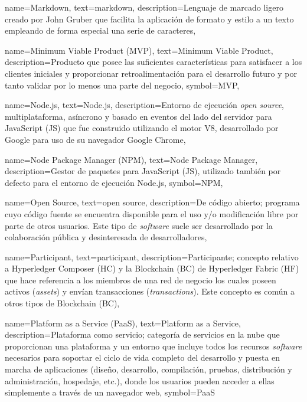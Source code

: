 {
    name={Markdown},
    text={markdown},
    description={Lenguaje de marcado ligero creado por John Gruber que facilita la aplicación de formato y estilo a un texto empleando de forma especial una serie de caracteres},
}

{
    name={Minimum Viable Product (MVP)},
    text={Minimum Viable Product},
    description={Producto que posee las suficientes características para satisfacer a los clientes iniciales y proporcionar retroalimentación para el desarrollo futuro y por tanto validar por lo menos una parte del negocio},
    symbol={MVP},
}

{
    name={Node.js},
    text={Node.js},
    description={Entorno de ejecución \textit{open source}, multiplataforma, asíncrono y basado en eventos del lado del servidor para JavaScript (JS) que fue construido utilizando el motor V8, desarrollado por Google para uso de su navegador Google Chrome},
}

{
    name={Node Package Manager (NPM)},
    text={Node Package Manager},
    description={Gestor de paquetes para JavaScript (JS), utilizado también por defecto para el entorno de ejecución Node.js},
    symbol={NPM},
}

{
    name={Open Source},
    text={open source},
    description={De código abierto; programa cuyo código fuente se encuentra disponible para el uso y/o modificación libre por parte de otros usuarios. Este tipo de \textit{software} suele ser desarrollado por la colaboración pública y desinteresada de desarrolladores},
}

{
    name={Participant},
    text={participant},
    description={Participante; concepto relativo a Hyperledger Composer (HC) y la Blockchain (BC) de Hyperledger Fabric (HF) que hace referencia a los miembros de una red de negocio los cuales poseen activos (\textit{assets}) y envían transacciones (\textit{transactions}). Este concepto es común a otros tipos de Blockchain (BC)},
}

{
    name={Platform as a Service (PaaS)},
    text={Platform as a Service},
    description={Plataforma como servicio; categoría de servicios en la nube que proporcionan una plataforma y un entorno que incluye todos los recursos \textit{software} necesarios para soportar el ciclo de vida completo del desarrollo y puesta en marcha de aplicaciones (diseño, desarrollo, compilación, pruebas, distribución y administración, hospedaje, etc.), donde los usuarios pueden acceder a ellas simplemente a través de un navegador web},
    symbol={PaaS}
}

